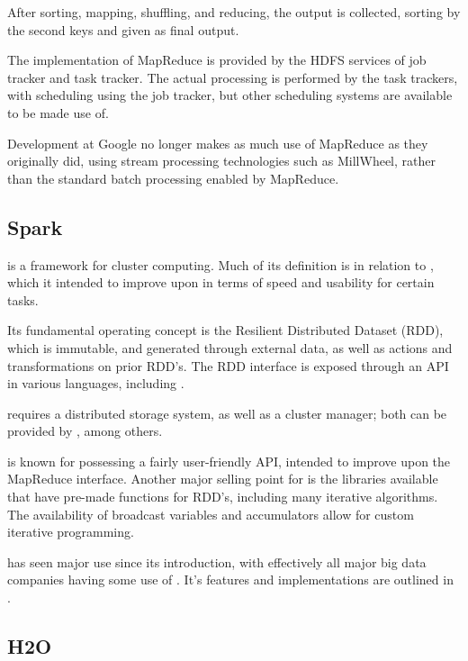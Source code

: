 After sorting, mapping, shuffling, and reducing, the output is
collected, sorting by the second keys and given as final output.

The implementation of MapReduce is provided by the HDFS services of job
tracker and task tracker. The actual processing is performed by the task
trackers, with scheduling using the job tracker, but other scheduling
systems are available to be made use of.

Development at Google no longer makes as much use of MapReduce as they
originally did, using stream processing technologies such as MillWheel,
rather than the standard batch processing enabled by
MapReduce\cite{akidau2013millwheel}.

\subsection{Spark}\label{sec:spark}

 is a framework for cluster computing\cite{zaharia2010spark}. Much
of its definition is in relation to , which it intended to
improve upon in terms of speed and usability for certain tasks.

Its fundamental operating concept is the Resilient Distributed Dataset
(RDD), which is immutable, and generated through external data, as well
as actions and transformations on prior RDD's. The RDD interface is
exposed through an API in various languages, including \R{}.

 requires a distributed storage system, as well as a cluster
manager; both can be provided by , among others.

 is known for possessing a fairly user-friendly API, intended to
improve upon the MapReduce interface. Another major selling point for
 is the libraries available that have pre-made functions for RDD's,
including many iterative algorithms. The availability of broadcast
variables and accumulators allow for custom iterative programming.

 has seen major use since its introduction, with effectively all
major big data companies having some use of . It's features and
implementations are outlined in \textcite{zaharia2016apache}.

\subsection{H2O}\label{sec:h2o}

